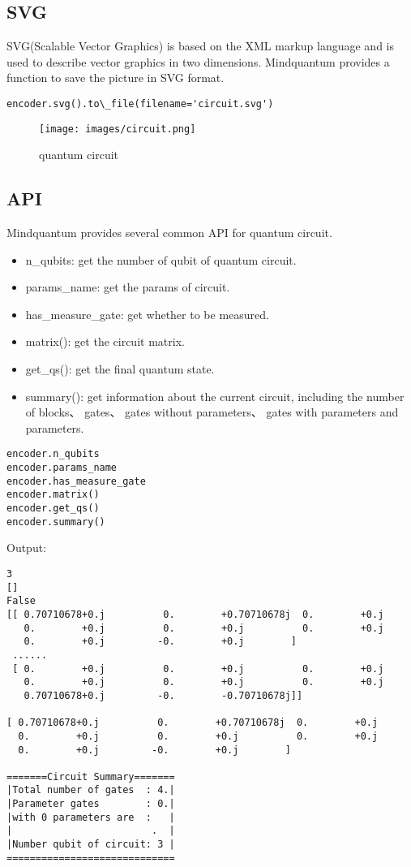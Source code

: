\subsection{SVG}
SVG(Scalable Vector Graphics) is based on the XML markup language and is used to describe vector graphics in two dimensions. Mindquantum provides a function to save the picture in SVG format.
\begin{lstlisting}
encoder.svg().to\_file(filename='circuit.svg')
\end{lstlisting}
    \begin{figure}[h]
       \begin{center}
            \texttt{[image: images/circuit.png]}
        \end{center}
        \caption{quantum circuit}
    \end{figure}
\subsection{API}
Mindquantum provides several common API for quantum circuit.
\begin{itemize}
    \item n\_qubits: get the number of qubit of quantum circuit.
    \item params\_name: get the params of circuit.
    \item has\_measure\_gate: get whether to be measured.
    \item matrix(): get the circuit matrix.
    \item get\_qs(): get the final quantum state.
    \item summary(): get information about the current circuit, including the number of blocks、 gates、 gates without parameters、 gates with parameters and parameters.
\end{itemize}
\begin{lstlisting}
encoder.n_qubits
encoder.params_name
encoder.has_measure_gate
encoder.matrix() 
encoder.get_qs()
encoder.summary()
\end{lstlisting}
Output:
\begin{lstlisting}
3
[]
False
[[ 0.70710678+0.j          0.        +0.70710678j  0.        +0.j
   0.        +0.j          0.        +0.j          0.        +0.j
   0.        +0.j         -0.        +0.j        ]
 ......
 [ 0.        +0.j          0.        +0.j          0.        +0.j
   0.        +0.j          0.        +0.j          0.        +0.j
   0.70710678+0.j         -0.        -0.70710678j]]
   
[ 0.70710678+0.j          0.        +0.70710678j  0.        +0.j
  0.        +0.j          0.        +0.j          0.        +0.j
  0.        +0.j         -0.        +0.j        ]
  
=======Circuit Summary=======
|Total number of gates  : 4.|
|Parameter gates        : 0.|
|with 0 parameters are  :   |
|                        .  |
|Number qubit of circuit: 3 |
=============================  
\end{lstlisting}
